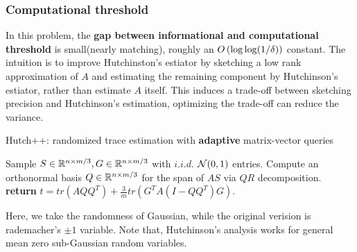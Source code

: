 \subsubsection{Computational threshold}
In this problem, the \textbf{gap between informational and computational threshold} is small(nearly matching), roughly an $O\left(\log\log(1/\delta)\right)$ constant.
The intuition is to improve Hutchinston's estiator by sketching a low rank approximation of $A$ and estimating the remaining component by Hutchinson’s estiator, rather than estimate $A$ itself. 
This induces a trade-off between sketching precision and Hutchinson’s estimation, optimizing the trade-off can reduce the variance.

\bigskip
\begin{breakablealgorithm}
\caption{Hutch++: randomized trace estimation with \textbf{adaptive} matrix-vector queries}
\label{hutch}
\begin{algorithmic}[1]
\State Sample $S\in\mathbb{R}^{n\times m/3},G\in\mathbb{R}^{n\times m/3}$ with $i.i.d.$ $\mathcal{N}(0,1)$ entries.
\State Compute an orthonormal basis $Q\in\mathbb{R}^{n\times m/3}$ for the span of $AS$ via $QR$ decomposition.
\State \textbf{return} $t=tr(AQQ^T)+\frac{3}{m}tr(G^TA(I-QQ^T)G)$.
\end{algorithmic}
\end{breakablealgorithm}
\bigskip

\begin{rmk}
Here, we take the randomness of Gaussian\cite{jpwz21}, while the original verision is rademacher's $\pm1$ variable\cite{mmmw21}. Note that,
Hutchinson's analysis works for general mean zero sub-Gaussian random variables.
\end{rmk}

